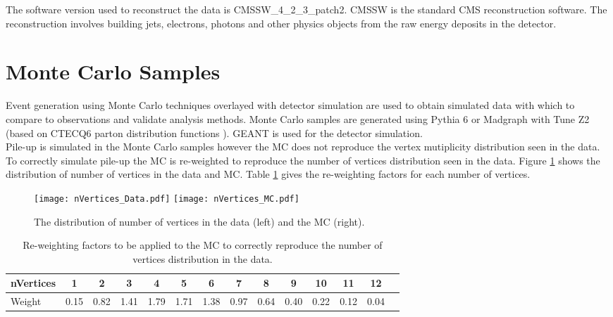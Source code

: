 The software version used to reconstruct the data is CMSSW\_4\_2\_3\_patch2. 
CMSSW is the standard CMS reconstruction software. The reconstruction involves 
building jets, electrons, photons and other physics objects from the raw energy 
deposits in the detector.

\section{Monte Carlo Samples}
\label{sec:Monte_Carlo_Samples}

Event generation using Monte Carlo techniques overlayed with detector simulation
are used to obtain simulated data with which to compare to observations and
validate analysis methods. Monte Carlo samples are generated using Pythia 6 
\cite{pythia6} or Madgraph \cite{madgraph} with Tune Z2 (based on CTECQ6 parton 
distribution functions \cite{tuneZ2}). GEANT \cite{geant} is used for the 
detector simulation. \\

Pile-up is simulated in the Monte Carlo samples however the MC does not
reproduce the vertex mutiplicity distribution seen in the data. To correctly
simulate pile-up the MC is re-weighted to reproduce the number of vertices
distribution seen in the data. Figure \ref{fig:nVertices} shows the distribution
of number of vertices in the data and MC. Table \ref{tab:factors} gives the 
re-weighting factors for each number of vertices. \\

\begin{figure}
\texttt{[image: nVertices\_Data.pdf]}
\texttt{[image: nVertices\_MC.pdf]}
\caption{The distribution of number of vertices in the data (left) and the MC
(right).}
\label{fig:nVertices}
\end{figure}

\begin{table}
\begin{center}
{\scriptsize
\begin{tabular}{|l|c|c|c|c|c|c|c|c|c|c|c|c|c|}
\hline
nVertices & 1 & 2 & 3 & 4 & 5 & 6 & 7 & 8 & 9 & 10 & 11 & 12 \\
\hline
Weight & 0.15 & 0.82 & 1.41 & 1.79 & 1.71 & 1.38 & 0.97 & 0.64 & 0.40 & 0.22 &
0.12 & 0.04 \\
\hline
\end{tabular}}
\end{center}
\caption{Re-weighting factors to be applied to the MC to correctly reproduce the
number of vertices distribution in the data.}
\label{tab:factors}
\end{table}

